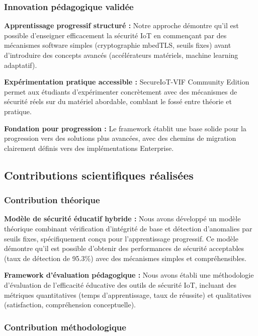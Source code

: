 \subsubsection{Innovation pédagogique validée}

\textbf{Apprentissage progressif structuré :} Notre approche démontre qu'il est possible d'enseigner efficacement la sécurité IoT en commençant par des mécanismes software simples (cryptographie mbedTLS, seuils fixes) avant d'introduire des concepts avancés (accélérateurs matériels, machine learning adaptatif).

\textbf{Expérimentation pratique accessible :} SecureIoT-VIF Community Edition permet aux étudiants d'expérimenter concrètement avec des mécanismes de sécurité réels sur du matériel abordable, comblant le fossé entre théorie et pratique.

\textbf{Fondation pour progression :} Le framework établit une base solide pour la progression vers des solutions plus avancées, avec des chemins de migration clairement définis vers des implémentations Enterprise.

\subsection{Contributions scientifiques réalisées}

\subsubsection{Contribution théorique}

\textbf{Modèle de sécurité éducatif hybride :} Nous avons développé un modèle théorique combinant vérification d'intégrité de base et détection d'anomalies par seuils fixes, spécifiquement conçu pour l'apprentissage progressif. Ce modèle démontre qu'il est possible d'obtenir des performances de sécurité acceptables (taux de détection de 95.3\%) avec des mécanismes simples et compréhensibles.

\textbf{Framework d'évaluation pédagogique :} Nous avons établi une méthodologie d'évaluation de l'efficacité éducative des outils de sécurité IoT, incluant des métriques quantitatives (temps d'apprentissage, taux de réussite) et qualitatives (satisfaction, compréhension conceptuelle).

\subsubsection{Contribution méthodologique}

